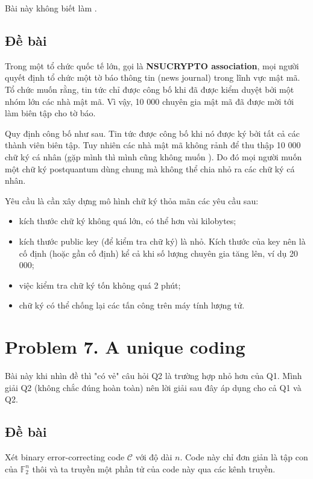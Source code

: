 Bài này không biết làm .

\subsection*{Đề bài}

Trong một tổ chức quốc tế lớn, gọi là \textbf{NSUCRYPTO association}, mọi người quyết định tổ chức một tờ báo thông tin (news journal) trong lĩnh vực mật mã. Tổ chức muốn rằng, tin tức chỉ được công bố khi đã được kiểm duyệt bởi một nhóm lớn các nhà mật mã. Vì vậy, 10 000 chuyên gia mật mã đã được mời tới làm biên tập cho tờ báo.

Quy định công bố như sau. Tin tức được công bố khi nó được ký bởi tất cả các thành viên biên tập. Tuy nhiên các nhà mật mã không rảnh để thu thập 10 000 chữ ký cá nhân (gặp mình thì mình cũng không muốn ). Do đó mọi người muốn một chữ ký postquantum dùng chung mà không thể chia nhỏ ra các chữ ký cá nhân.

Yêu cầu là cần xây dựng mô hình chữ ký thỏa mãn các yêu cầu sau:

\begin{itemize}
    \item kích thước chữ ký không quá lớn, có thể hơn vài kilobytes;
    \item kích thước public key (để kiểm tra chữ ký) là nhỏ. Kích thước của key nên là cố định (hoặc gần cố định) kể cả khi số lượng chuyên gia tăng lên, ví dụ 20 000;
    \item việc kiểm tra chữ ký tốn không quá 2 phút;
    \item chữ ký có thể chống lại các tấn công trên máy tính lượng tử.
\end{itemize}

\section*{Problem 7. A unique coding}

Bài này khi nhìn đề thì "có vẻ" câu hỏi Q2 là trường hợp nhỏ hơn của Q1. Mình giải Q2 (không chắc đúng hoàn toàn) nên lời giải sau đây áp dụng cho cả Q1 và Q2.

\subsection*{Đề bài}

Xét binary error-correcting code $\mathcal{C}$ với độ dài $n$. Code này chỉ đơn giản là tập con của $\mathbb{F}_2^n$ thôi và ta truyền một phần tử của code này qua các kênh truyền.

